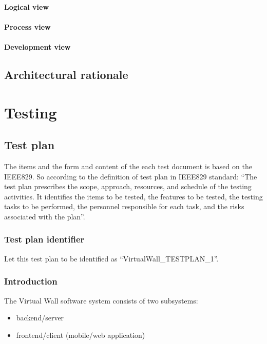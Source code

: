 \documentclass[11pt]{book}
\begin{document}
\subsubsection{Logical view}

\subsubsection{Process view}

\subsubsection{Development view}

\section{Architectural rationale}

\chapter{Testing}

\section{Test plan}

The items and the form and content of the each test document is based on the IEEE829. So according to the definition of test plan in IEEE829 standard: ``The test plan prescribes the scope, approach, resources, and schedule of the testing activities. It identifies the items to be tested, the features to be tested, the testing tasks to be performed, the personnel responsible for each task, and the risks associated with the plan''.

\subsection{Test plan identifier}
Let this test plan to be identified as ``VirtualWall\_TESTPLAN\_1''.

\subsection{Introduction}
The Virtual Wall software system consists of two subsystems:

\begin{itemize}
	\item backend/server
	\item frontend/client (mobile/web application)
\end{itemize}
\end{document}
